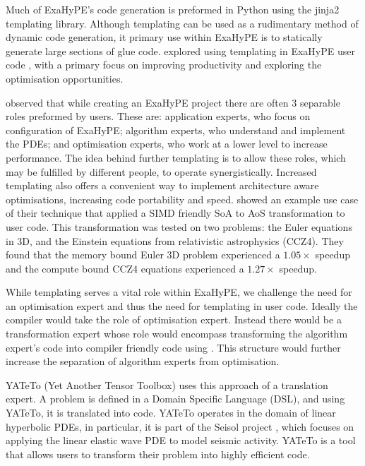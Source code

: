 

Much of ExaHyPE's code generation is preformed in Python using the jinja2 templating library.
Although templating can be used as a rudimentary method of dynamic code generation, it primary use within ExaHyPE is to statically generate large sections of glue code.
\citeauthor{templateExahype} explored using templating in ExaHyPE user code \cite{templateExahype}, with a primary focus on improving productivity and exploring the optimisation opportunities.

\citeauthor{templateExahype} observed that while creating an ExaHyPE project there are often 3 separable roles preformed by users.
These are: application experts, who focus on configuration of ExaHyPE; algorithm experts, who understand and implement the PDEs; and optimisation experts, who work at a lower level to increase performance.
The idea behind further templating is to allow these roles, which may be fulfilled by different people, to operate synergistically.
Increased templating also offers a convenient way to implement architecture aware optimisations, increasing code portability and speed.
\citeauthor{templateExahype} showed an example use case of their technique that applied a SIMD friendly SoA to AoS transformation to user code.
This transformation was tested on two problems: the Euler equations in 3D, and the Einstein equations from relativistic astrophysics (CCZ4).
They found that the memory bound Euler 3D problem experienced a $1.05\times$ speedup and the compute bound CCZ4 equations experienced a $1.27\times$ speedup.

While templating serves a vital role within ExaHyPE, we challenge the need for an optimisation expert and thus the need for templating in user code.
Ideally the compiler would take the role of optimisation expert.
Instead there would be a transformation expert whose role would encompass transforming the algorithm expert's code into compiler friendly code using \phlat.
This structure would further increase the separation of algorithm experts from optimisation.


YATeTo (Yet Another Tensor Toolbox) \cite{YATeTo} uses this approach of a translation expert.
A problem is defined in a Domain Specific Language (DSL), and using YATeTo, it is translated into code.
YATeTo operates in the domain of linear hyperbolic PDEs, in particular, it is part of the Seisol project \cite{seisolPFLOP}, which focuses on applying the linear elastic wave PDE to model seismic activity.
YATeTo is a tool that allows users to transform their problem into highly efficient code.   

